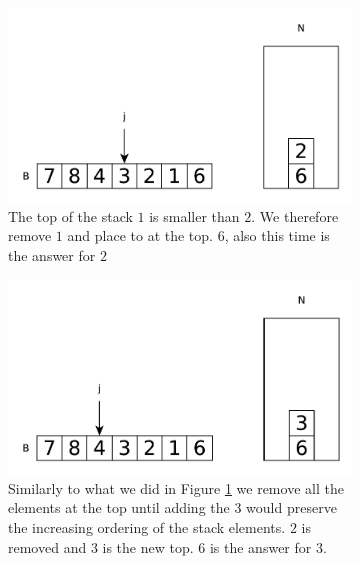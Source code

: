 \begin{figure}
\begin{subfigure}[t]{0.49\textwidth}
\begin{framed}
			\includegraphics[width=1\linewidth]{sources/next_greater_element/images/stack3}
		\end{framed}
		\caption{The top of the stack $1$ is smaller than $2$. We therefore remove $1$ and place to at the top. $6$, also this time is the answer for $2$}
		\label{fig:next_greater:variation1:stack3}
	 \end{subfigure}
	 \hfill
	 \begin{subfigure}[t]{0.49\textwidth}
		\begin{framed}
			\includegraphics[width=1\linewidth]{sources/next_greater_element/images/stack4}
		\end{framed}
		\caption{Similarly to what we did in Figure \ref{fig:next_greater:variation1:stack3} we remove all the elements at the top until adding the $3$ would preserve the increasing ordering of the stack elements. $2$ is removed and $3$ is the new top. $6$ is the answer for $3$.}
		\label{fig:next_greater:variation1:stack4}
	 \end{subfigure}
	 \hfill
	 \begin{subfigure}[t]{0.49\textwidth}
		\begin{framed}

\end{framed}
\end{subfigure}
\end{figure}
